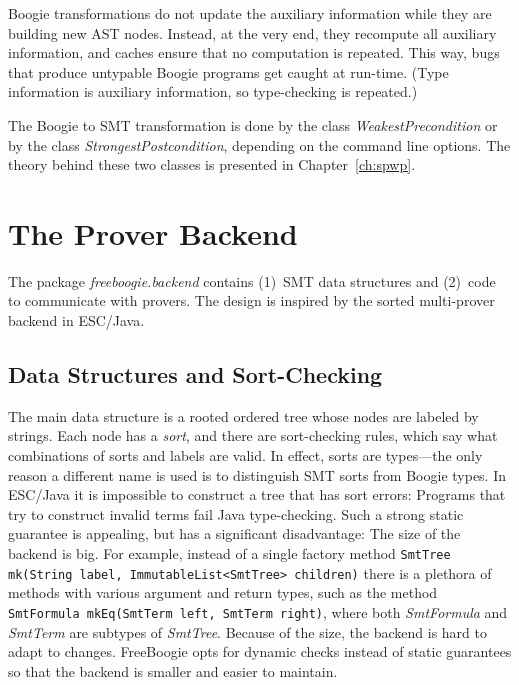 \documentclass{llncs}
\newcommand{\jmlCode}{\lstinline[style=jml,basicstyle=\normalsize]}
\newcommand{\escjava}{ESC\slash Java\xspace}
\begin{document}
Boogie transformations do not update the auxiliary information
while they are building new AST nodes. Instead, at the very end,
they recompute all auxiliary information, and caches ensure that
no computation is repeated. This way, bugs that produce untypable
Boogie programs get caught at run-time. (Type information is
auxiliary information, so type-checking is repeated.)

The Boogie to SMT transformation is done by the
class \textit{WeakestPrecondition} or by the class
\textit{StrongestPostcondition}, depending on the command line
options. The theory behind these two classes is presented in
Chapter~\ref{ch:spwp}.

\section{The Prover Backend}
\label{sec:design.backend}

The package \textit{freeboogie.backend} contains (1)~SMT data
structures and (2)~code to communicate with provers. The design
is inspired by the sorted multi-prover backend in \escjava.

\subsection{Data Structures and Sort-Checking}
\label{sec:design.ds}

The main data structure is a rooted ordered tree whose nodes are
labeled by strings. Each node has a \emph{sort}, and there are
sort-checking rules, which say what combinations of sorts and
labels are valid. In effect, sorts are types---the only reason a
different name is used is to distinguish SMT sorts from
Boogie types. In \escjava it is impossible to construct a tree
that has sort errors: Programs that try to construct invalid
terms fail Java type-checking. Such a strong static guarantee is
appealing, but has a significant disadvantage: The size of the
backend is big. For example, instead of a single factory method
  \jmlCode|SmtTree mk(String label, ImmutableList<SmtTree> children)|
there is a plethora of methods with various argument and return
types, such as the method
  \jmlCode|SmtFormula mkEq(SmtTerm left, SmtTerm right)|,
where both \textit{SmtFormula} and \textit{SmtTerm} are subtypes
of \textit{SmtTree}. Because of the size, the backend is hard to
adapt to changes. FreeBoogie opts for dynamic checks instead of
static guarantees so that the backend is smaller and easier to
maintain.
\end{document}
